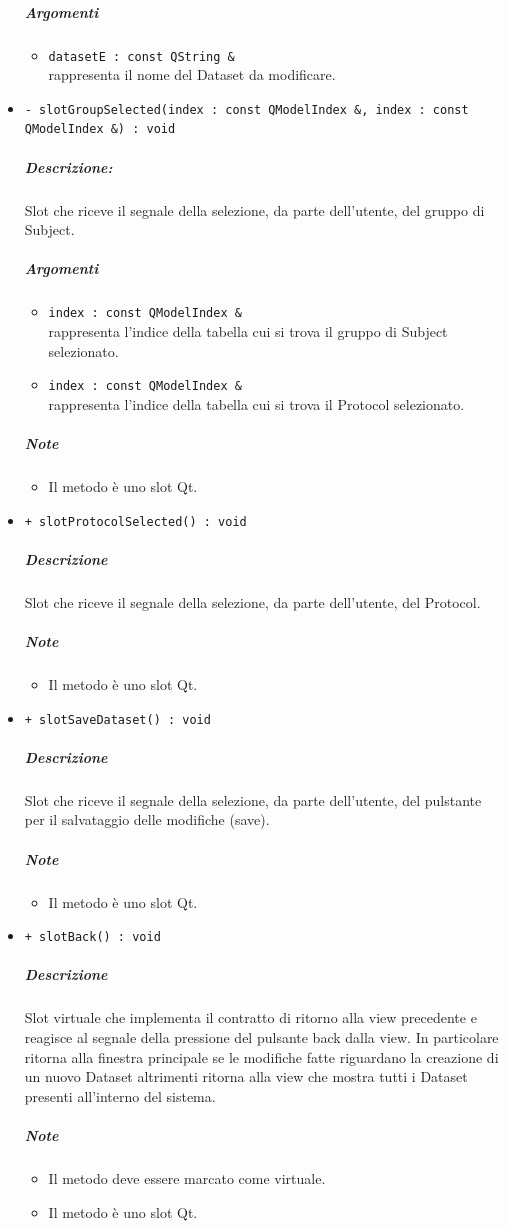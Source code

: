 \begin{itemize}
			\color{black}
			\subparagraph{Argomenti}
			\begin{itemize}
				\item \color{RoyalPurple} \verb!datasetE : const QString &!\\				
\color{black} rappresenta il nome del Dataset\g{} da modificare.
			\end{itemize}
			\item \color{blue} \verb!- slotGroupSelected(index : const QModelIndex &, index : const QModelIndex &) : void!
			\color{black}
			\subparagraph{Descrizione:} Slot\g{} che riceve il segnale della selezione, da parte dell'utente, del gruppo di Subject\g{}.
			\color{black}
			\subparagraph{Argomenti}
			\begin{itemize}
				\item \color{RoyalPurple} \verb!index : const QModelIndex &!\\				
\color{black} rappresenta l'indice della tabella cui si trova il gruppo di Subject\g{} selezionato.
				\item \color{RoyalPurple} \verb!index : const QModelIndex &!\\				
\color{black} rappresenta l'indice della tabella cui si trova il Protocol\g{} selezionato.
			\end{itemize}
			\subparagraph{Note}
			\begin{itemize}
				\item Il metodo è uno slot\g{} Qt\g{}.
			\end{itemize}
			\item \color{blue} \verb!+ slotProtocolSelected() : void!
			\color{black}
			\subparagraph{Descrizione} Slot\g{} che riceve il segnale della selezione, da parte dell'utente, del Protocol\g{}.
			\subparagraph{Note}
			\begin{itemize}
				\item Il metodo è uno slot\g{} Qt\g{}.
			\end{itemize}
			\item \color{blue} \verb!+ slotSaveDataset() : void!
			\color{black}
			\subparagraph{Descrizione} Slot\g{} che riceve il segnale della selezione, da parte dell'utente, del pulstante per il salvataggio delle modifiche (save).
			\subparagraph{Note}
			\begin{itemize}
				\item Il metodo è uno slot\g{} Qt\g{}.
			\end{itemize}
			\item \color{blue} \verb!+ slotBack() : void!
			\color{black}
			\subparagraph{Descrizione} Slot\g{}  virtuale che implementa il contratto di ritorno alla view precedente e reagisce al segnale della pressione del pulsante back dalla view. In particolare ritorna alla finestra principale se le modifiche fatte riguardano la creazione di un nuovo Dataset\g{} altrimenti ritorna alla view che mostra tutti i Dataset\g{} presenti all'interno del sistema.
			\subparagraph{Note}
			\begin{itemize}
				\item Il metodo deve essere marcato come virtuale.
				\item Il metodo è uno slot\g{} Qt\g{}.
			\end{itemize}
		\end{itemize}
		\pagebreak
